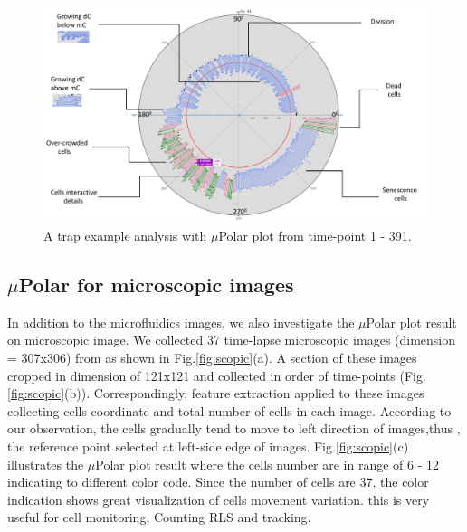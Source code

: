 \documentclass[conference]{IEEEtran}
\begin{document}
\begin{figure}
\centering
\includegraphics[width=\textwidth,height=10 cm]{Patterns/explain.pdf}
\caption{A trap example analysis with $\mu$Polar plot from time-point 1 - 391.}
\label{fig:explain}
\end{figure}


\subsection{$\mu$Polar for microscopic images}

In addition to the microfluidics images, we also investigate the $\mu$Polar plot result on microscopic image. We collected 37 time-lapse microscopic images (dimension = 307x306) from \cite{ref05} as shown in Fig.\ref{fig:scopic}(a). A section of these images cropped in dimension of 121x121 and collected in order of time-points (Fig.\ref{fig:scopic}(b)). Correspondingly, feature extraction applied to these images collecting cells coordinate and total number of cells in each image. According to our observation, the cells gradually tend to move to left direction of images,thus , the reference point selected at left-side edge of images. Fig.\ref{fig:scopic}(c) illustrates the $\mu$Polar plot result where the cells number are in range of 6 - 12 indicating to different color code. Since  the number of cells are 37, the color indication shows great visualization of cells movement variation. this is very useful for cell monitoring, Counting RLS and tracking.        
\end{document}
